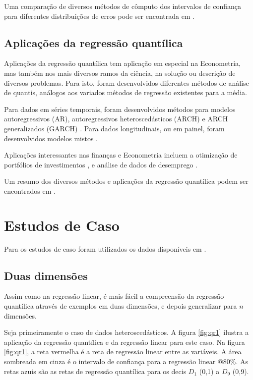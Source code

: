 \documentclass[a4paper, 12pt]{article}
\begin{document}
Uma comparação de diversos métodos de cômputo dos intervalos de
confiança para diferentes distribuições de erros pode ser encontrada em
\textcite{rqci}.

\hypertarget{aplicacoes-da-regressao-quantilica}{%
\subsection{Aplicações da regressão
quantílica}\label{aplicacoes-da-regressao-quantilica}}

Aplicações da regressão quantílica tem aplicação em especial na
Econometria, mas também nos mais diversos ramos da ciência, na solução
ou descrição de diversos problemas. Para isto, foram desenvolvidos
diferentes métodos de análise de quantis, análogos aos variados métodos
de regressão existentes para a média.

Para dados em séries temporais, foram desenvolvidos métodos para modelos
autoregressivos (AR), autoregressivos heteroscedásticos (ARCH) e ARCH
generalizados (GARCH) \autocites[ver][]{qar}{arch}{garch}. Para dados
longitudinais, ou em painel, foram desenvolvidos modelos mistos
\autocite[ver][]{koenker2003}.

Aplicações interessantes nas finanças e Econometria incluem a otimização
de portfólios de investimentos \autocite{portfolio}, e análise de dados
de desemprego \autocite{duration}.

Um resumo dos diversos métodos e aplicações da regressão quantílica
podem ser encontrados em \textcite{qr40}.

\hypertarget{estudos-de-caso}{%
\section{Estudos de Caso}\label{estudos-de-caso}}

Para os estudos de caso foram utilizados os dados disponíveis em
\textcite{hochheim}.

\hypertarget{duas-dimensoes}{%
\subsection{Duas dimensões}\label{duas-dimensoes}}

Assim como na regressão linear, é mais fácil a compreensão da regressão
quantílica através de exemplos em duas dimensões, e depois generalizar
para \(n\) dimensões.

Seja primeiramente o caso de dados heteroscedásticos. A figura
\ref{fig:qr1} ilustra a aplicação da regressão quantílica e da regressão
linear para este caso. Na figura \ref{fig:qr1}, a reta vermelha é a reta
de regressão linear entre as variáveis. A área sombreada em cinza é o
intervalo de confiança para a regressão linear @80\%. As retas azuis são
as retas de regressão quantílica para os decis \(D_1\) (0,1) a \(D_9\)
(0,9).
\end{document}
